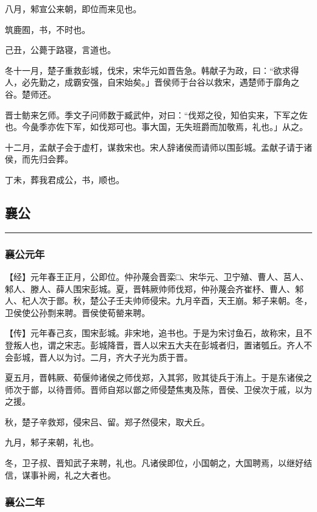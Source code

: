 \documentclass[]{article}
\begin{document}
八月，邾宣公来朝，即位而来见也。

筑鹿囿，书，不时也。

己丑，公薨于路寝，言道也。

冬十一月，楚子重救彭城，伐宋，宋华元如晋告急。韩献子为政，曰：``欲求得人，必先勤之，成霸安强，自宋始矣。」晋侯师于台谷以救宋，遇楚师于靡角之谷。楚师还。

晋士鲂来乞师。季文子问师数于臧武仲，对曰：``伐郑之役，知伯实来，下军之佐也。今彘季亦佐下军，如伐郑可也。事大国，无失班爵而加敬焉，礼也。」从之。

十二月，孟献子会于虚朾，谋救宋也。宋人辞诸侯而请师以围彭城。孟献子请于诸侯，而先归会葬。

丁未，葬我君成公，书，顺也。

\hypertarget{header-n1807}{%
\subsection{襄公}\label{header-n1807}}

\begin{center}\rule{0.5\linewidth}{\linethickness}\end{center}

\hypertarget{header-n1809}{%
\subsubsection{襄公元年 }\label{header-n1809}}

【经】元年春王正月，公即位。仲孙蔑会晋栾□、宋华元、卫宁殖、曹人、莒人、邾人、滕人、薛人围宋彭城。夏，晋韩厥帅师伐郑，仲孙蔑会齐崔杼、曹人、邾人、杞人次于鄫。秋，楚公子壬夫帅师侵宋。九月辛酉，天王崩。邾子来朝。冬，卫侯使公孙剽来聘。晋侯使荀罃来聘。

【传】元年春己亥，围宋彭城。非宋地，追书也。于是为宋讨鱼石，故称宋，且不登叛人也，谓之宋志。彭城降晋，晋人以宋五大夫在彭城者归，置诸瓠丘。齐人不会彭城，晋人以为讨。二月，齐大子光为质于晋。

夏五月，晋韩厥、荀偃帅诸侯之师伐郑，入其郛，败其徒兵于洧上。于是东诸侯之师次于鄫，以待晋师。晋师自郑以鄫之师侵楚焦夷及陈，晋侯、卫侯次于戚，以为之援。

秋，楚子辛救郑，侵宋吕、留。郑子然侵宋，取犬丘。

九月，邾子来朝，礼也。

冬，卫子叔、晋知武子来聘，礼也。凡诸侯即位，小国朝之，大国聘焉，以继好结信，谋事补阙，礼之大者也。

\hypertarget{header-n1818}{%
\subsubsection{襄公二年}\label{header-n1818}}
\end{document}
